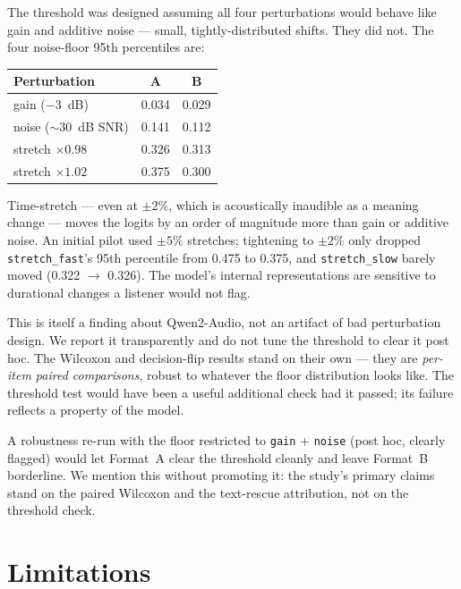 \documentclass[11pt]{article}
\begin{document}
The threshold was designed assuming all four perturbations would
behave like gain and additive noise --- small, tightly-distributed
shifts. They did not. The four noise-floor 95th percentiles are:

\begin{center}
\small
\begin{tabular}{l c c}
\toprule
\textbf{Perturbation} & \textbf{A} & \textbf{B} \\
\midrule
gain ($-3$~dB) & 0.034 & 0.029 \\
noise ($\sim$30~dB SNR) & 0.141 & 0.112 \\
stretch $\times 0.98$ & 0.326 & 0.313 \\
stretch $\times 1.02$ & 0.375 & 0.300 \\
\bottomrule
\end{tabular}
\end{center}

Time-stretch --- even at $\pm 2\%$, which is acoustically
inaudible as a meaning change --- moves the logits by an order of
magnitude more than gain or additive noise. An initial pilot used
$\pm 5\%$ stretches; tightening to $\pm 2\%$ only dropped
\texttt{stretch\_fast}'s 95th percentile from 0.475 to 0.375, and
\texttt{stretch\_slow} barely moved (0.322 $\rightarrow$ 0.326).
The model's internal representations are sensitive to durational
changes a listener would not flag.

This is itself a finding about Qwen2-Audio, not an artifact of
bad perturbation design. We report it transparently and do not
tune the threshold to clear it post hoc. The Wilcoxon and
decision-flip results stand on their own --- they are
\emph{per-item paired comparisons}, robust to whatever the floor
distribution looks like. The threshold test would have been a
useful additional check had it passed; its failure reflects a
property of the model.

A robustness re-run with the floor restricted to \texttt{gain} +
\texttt{noise} (post hoc, clearly flagged) would let Format~A
clear the threshold cleanly and leave Format~B borderline. We
mention this without promoting it: the study's primary claims
stand on the paired Wilcoxon and the text-rescue attribution, not
on the threshold check.

\section{Limitations}
\end{document}
